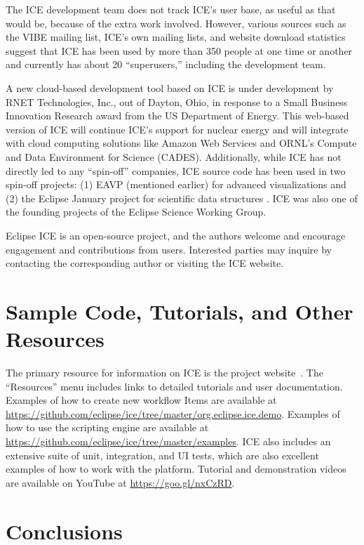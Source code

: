 The ICE development team does not track ICE's user base, as useful as
that would be, because of the extra work involved. However, various
sources such as the VIBE mailing list, ICE's own mailing lists, and
website download statistics suggest that ICE has been used by more than 350
people at one time or another and currently has about 20
``superusers,'' including the development team.

A new cloud-based development tool based on ICE is under development by
RNET Technologies, Inc., out of Dayton, Ohio, in response to a Small Business Innovation 
Research award from the US Department of Energy. This web-based version of 
ICE will continue ICE's support for nuclear energy and will integrate with cloud 
computing solutions like Amazon Web Services and ORNL's Compute and Data
Environment for Science (CADES). Additionally, while ICE has not directly led to
any ``spin-off'' companies, ICE source code has been used
in two spin-off projects: (1) EAVP (mentioned earlier) for advanced
visualizations and (2) the Eclipse January project for scientific data
structures \cite{graham_eclipse_2016}. ICE was also one of the founding
projects of the Eclipse Science Working Group.

Eclipse ICE is an open-source project, and the authors welcome and encourage
engagement and contributions from users. Interested parties may inquire by
contacting the corresponding author or visiting the ICE website.

\section{Sample Code, Tutorials, and Other
Resources}\label{sample-code-tutorials-and-other-resources}

The primary resource for information on ICE is the project 
website~\cite{billings_eclipse_2016}. The ``Resources'' menu includes links to
detailed tutorials and user documentation. Examples of how to create
new workflow Items are available at
\url{https://github.com/eclipse/ice/tree/master/org.eclipse.ice.demo}.
Examples of how to use the scripting engine are available at
\url{https://github.com/eclipse/ice/tree/master/examples}. ICE also includes an
extensive suite of unit, integration, and UI tests, which are
also excellent examples of how to work with the platform. Tutorial and demonstration videos are available on YouTube at \url{https://goo.gl/nxCzRD}.

\section{Conclusions}\label{conclusions}


